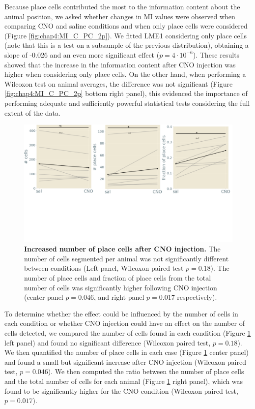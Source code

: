 Because place cells contributed the most to the information content about the animal position, we asked whether changes in MI values were observed when comparing CNO and saline conditions and when only place cells were considered (Figure \ref{fig:chap4:MI_C_PC_2p}). 
We fitted LME1 considering only place cells (note that this is a test on a subsample of the previous distribution), obtaining a slope of -0.026 and an even more significant effect ($p=4 \cdot 10^{-6}$).
These results showed that the increase in the information content after CNO injection was higher when considering only place cells.
On the other hand, when performing a Wilcoxon test on animal averages, the difference was not significant (Figure \ref{fig:chap4:MI_C_PC_2p} bottom right panel), this evidenced the importance of performing adequate and sufficiently powerful statistical tests considering the full extent of the data.

\begin{figure}
    \centering
    \includegraphics[trim={0 200 0 0},clip,width=\textwidth]{Figures/Chapter4/pc_quantification_2p.pdf}
    \caption[Increased number of place cells after CNO injection.]{\textbf{Increased number of place cells after CNO injection.} 
    The number of cells segmented per animal was not significantly different between conditions (Left panel, Wilcoxon paired test $p = 0.18$). 
    The number of place cells and fraction of place cells from the total number of cells was significantly higher following CNO injection (center panel $p=0.046$, and right panel $p=0.017$ respectively).}
    \label{fig:chap4:pc_quantification_2p}
\end{figure}

To determine whether the effect could be influenced by the number of cells in each condition or whether CNO injection could have an effect on the number of cells detected, we compared the number of cells found in each condition (Figure \ref{fig:chap4:pc_quantification_2p} left panel) and found no significant difference (Wilcoxon paired test, $p=0.18$). 
We then quantified the number of place cells in each case (Figure \ref{fig:chap4:pc_quantification_2p} center panel) and found a small but significant increase after CNO injection (Wilcoxon paired test, $p=0.046$).
We then computed the ratio between the number of place cells and the total number of cells for each animal (Figure \ref{fig:chap4:pc_quantification_2p} right panel), which was found to be significantly higher for the CNO condition (Wilcoxon paired test, $p=0.017$).

